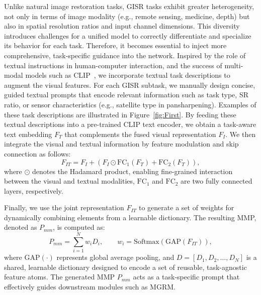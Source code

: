 \documentclass[lettersize,journal]{IEEEtran}
\begin{document}
Unlike natural image restoration tasks, GISR tasks exhibit greater heterogeneity, not only in terms of image modality (e.g., remote sensing, medicine, depth) but also in spatial resolution ratios and input channel dimensions. This diversity introduces challenges for a unified model to correctly differentiate and specialize its behavior for each task. Therefore, it becomes essential to inject more comprehensive, task-specific guidance into the network.
Inspired by the role of textual instructions in human-computer interaction, and the success of multi-modal models such as CLIP~\cite{radford2021learning}, we incorporate textual task descriptions to augment the visual features. For each GISR subtask, we manually design concise, guided textual prompts that encode relevant information such as task type, SR ratio, or sensor characteristics (e.g., satellite type in pansharpening). Examples of these task descriptions are illustrated in Figure~\ref{fig:First}.
By feeding these textual descriptions into a pre-trained CLIP text encoder, we obtain a task-aware text embedding $F_T$ that complements the fused visual representation $F_I$. We then integrate the visual and textual information by feature modulation and skip connection as follows:
\begin{equation}
    F_{IT} = F_I + (F_I \odot \mathrm{FC_1}(F_T) + \mathrm{FC_2}(F_T)),
\end{equation}
where $\odot$ denotes the Hadamard product, enabling fine-grained interaction between the visual and textual modalities, $\mathrm{FC_1}$ and $\mathrm{FC_2}$ are two fully connected layers, respectively.  

Finally, we use the joint representation $F_{IT}$ to generate a set of weights for dynamically combining elements from a learnable dictionary. The resulting MMP, denoted as $P_{mm}$, is computed as:
\begin{equation}
    P_{mm} = \sum_{i=1}^{N} w_i D_i, \qquad w_i = \text{Softmax}(\text{GAP}(F_{IT})),
\end{equation}
where $\text{GAP}(\cdot)$ represents global average pooling, and $D = [D_1, D_2, \ldots, D_N]$ is a shared, learnable dictionary designed to encode a set of reusable, task-agnostic feature atoms. The generated MMP $P_{mm}$ acts as a task-specific prompt that effectively guides downstream modules such as MGRM.
\end{document}
